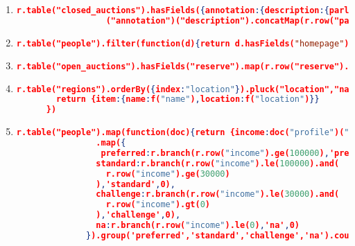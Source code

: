 \begin{enumerate}[label=Q\arabic*.]
    \item %
	\begin{lstlisting}[language=JSON]
	  r.table("closed_auctions").hasFields({annotation:{description:{parlist:true}}})
	              ("annotation")("description").concatMap(r.row("parlist")).hasFields({listitem:{parlist:true}})("listitem").concatMap(r.row("parlist")).hasFields({listitem:{text:{emph:{keyword:true}}}})
	\end{lstlisting}	

    
    \item %
	\begin{lstlisting}[language=JSON]
	  r.table("people").filter(function(d){return d.hasFields("homepage").not()}).map({person:{name:r.row("name")}})
	\end{lstlisting}	

    \item %
	\begin{lstlisting}[language=JSON]
	  r.table("open_auctions").hasFields("reserve").map(r.row("reserve").mul(2.20371))
	\end{lstlisting}	

    \item %
	\begin{lstlisting}[language=JSON]
	  r.table("regions").orderBy({index:"location"}).pluck("location","name").map(function(f){
	    return {item:{name:f("name"),location:f("location")}}
	  })
	\end{lstlisting}
	
    \item %
	\begin{lstlisting}[language=JSON]
	  r.table("people").map(function(doc){return {income:doc("profile")("income").default(0)}})
	            .map({
	             preferred:r.branch(r.row("income").ge(100000),'preferred',0),
	            standard:r.branch(r.row("income").le(100000).and(
	              r.row("income").ge(30000)
	            ),'standard',0),
	            challenge:r.branch(r.row("income").le(30000).and(
	              r.row("income").gt(0)
	            ),'challenge',0),
	            na:r.branch(r.row("income").le(0),'na',0)
	          }).group('preferred','standard','challenge','na').count()
	\end{lstlisting}

\end{enumerate}
